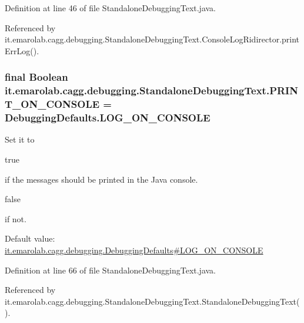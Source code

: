 Definition at line 46 of file Standalone\-Debugging\-Text.\-java.



Referenced by it.\-emarolab.\-cagg.\-debugging.\-Standalone\-Debugging\-Text.\-Console\-Log\-Ridirector.\-print\-Err\-Log().

\hypertarget{classit_1_1emarolab_1_1cagg_1_1debugging_1_1StandaloneDebuggingText_a5df7bc95dc452897fc12e474ac446f7b}{
\subsubsection[{P\-R\-I\-N\-T\-\_\-\-O\-N\-\_\-\-C\-O\-N\-S\-O\-L\-E}]{\setlength{\rightskip}{0pt plus 5cm}final Boolean it.\-emarolab.\-cagg.\-debugging.\-Standalone\-Debugging\-Text.\-P\-R\-I\-N\-T\-\_\-\-O\-N\-\_\-\-C\-O\-N\-S\-O\-L\-E = {\bf Debugging\-Defaults.\-L\-O\-G\-\_\-\-O\-N\-\_\-\-C\-O\-N\-S\-O\-L\-E}\hspace{0.3cm}{\ttfamily [static]}}}\label{classit_1_1emarolab_1_1cagg_1_1debugging_1_1StandaloneDebuggingText_a5df7bc95dc452897fc12e474ac446f7b}
Set it to
\begin{DoxyCode}
\textcolor{keyword}{true} 
\end{DoxyCode}
 if the messages should be printed in the Java console.
\begin{DoxyCode}
\textcolor{keyword}{false} 
\end{DoxyCode}
 if not. \par
 Default value\-: \hyperlink{classit_1_1emarolab_1_1cagg_1_1debugging_1_1DebuggingDefaults_a367caf2dc8777f38b40c160b848cafe0}{it.\-emarolab.\-cagg.\-debugging.\-Debugging\-Defaults\#\-L\-O\-G\-\_\-\-O\-N\-\_\-\-C\-O\-N\-S\-O\-L\-E} 

Definition at line 66 of file Standalone\-Debugging\-Text.\-java.



Referenced by it.\-emarolab.\-cagg.\-debugging.\-Standalone\-Debugging\-Text.\-Standalone\-Debugging\-Text().

